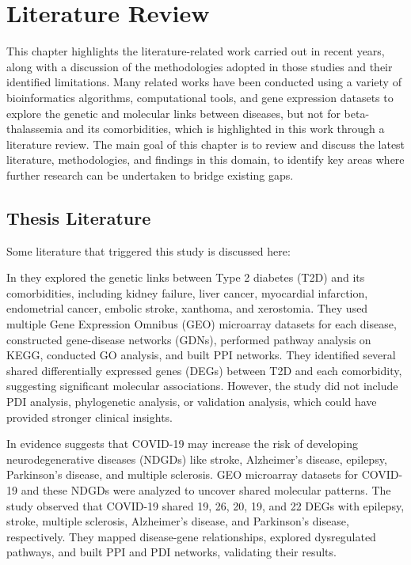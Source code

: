 \let\textcircled=\pgftextcircled
\chapter{Literature Review}
\label{chap:related}
This chapter highlights the literature-related work carried out in recent years, along with a discussion of the methodologies adopted in those studies and their identified limitations. Many related works have been conducted using a variety of bioinformatics algorithms, computational tools, and gene expression datasets to explore the genetic and molecular links between diseases, but not for beta-thalassemia and its comorbidities, which is highlighted in this work through a literature review. The main goal of this chapter is to review and discuss the latest literature, methodologies, and findings in this domain, to identify key areas where further research can be undertaken to bridge existing gaps.

\vspace{2mm}
\newpage

\section{Thesis Literature}
\label{sec:sec2_1}
Some literature that triggered this study is discussed here:

In \cite{b3} they explored the genetic links between Type 2 diabetes (T2D) and its comorbidities, including kidney failure, liver cancer, myocardial infarction, endometrial cancer, embolic stroke, xanthoma, and xerostomia. They used multiple Gene Expression Omnibus (GEO) microarray datasets for each disease, constructed gene-disease networks (GDNs), performed pathway analysis on KEGG, conducted GO analysis, and built PPI networks. They identified several shared differentially expressed genes (DEGs) between T2D and each comorbidity, suggesting significant molecular associations. However, the study did not include PDI analysis, phylogenetic analysis, or validation analysis, which could have provided stronger clinical insights.

In \cite{b4} evidence suggests that COVID-19 may increase the risk of developing neurodegenerative diseases (NDGDs) like stroke, Alzheimer's disease, epilepsy, Parkinson's disease, and multiple sclerosis. GEO microarray datasets for COVID-19 and these NDGDs were analyzed to uncover shared molecular patterns. The study observed that COVID-19 shared 19, 26, 20, 19, and 22 DEGs with epilepsy, stroke, multiple sclerosis, Alzheimer's disease, and Parkinson's disease, respectively. They mapped disease-gene relationships, explored dysregulated pathways, and built PPI and PDI networks, validating their results.

